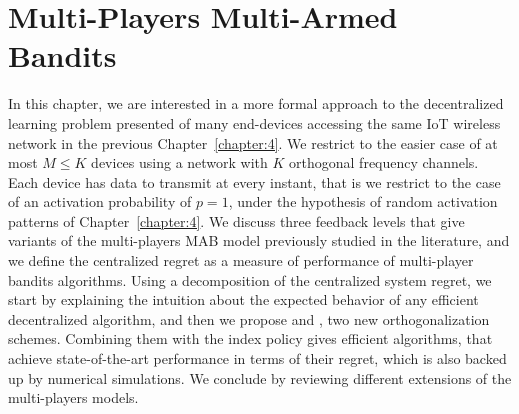 
\chapter{Multi-Players Multi-Armed Bandits}
\label{chapter:5}

\graphicspath{{2-Chapters/5-Chapter/Images/}{2-Chapters/5-Chapter/ALT_2018__MPBandits.git/figures/}}

\abstractStartChapter{}%
%
In this chapter, we are interested in a more formal approach to the decentralized learning problem presented of many end-devices accessing the same IoT wireless network
in the previous Chapter~\ref{chapter:4}.
We restrict to the easier case of at most $M \leq K$ devices using a network with $K$ orthogonal frequency channels.
Each device has data to transmit at every instant, that is we restrict to the case of an activation probability of $p=1$,
under the hypothesis of random activation patterns of Chapter~\ref{chapter:4}.
%
We discuss three feedback levels that give variants of the multi-players MAB model previously studied in the literature, and we define the centralized regret as a measure of performance of multi-player bandits algorithms.
%
Using a decomposition of the centralized system regret, we start by explaining the intuition about the expected behavior of any efficient decentralized algorithm, and then we propose \RandTopM{} and \MCTopM, two new orthogonalization schemes.
Combining them with the \klUCB{} index policy gives efficient algorithms, that achieve state-of-the-art performance in terms of their regret,
which is also backed up by numerical simulations.
We conclude by reviewing different extensions of the multi-players models.

\minitocStartChapter{}





